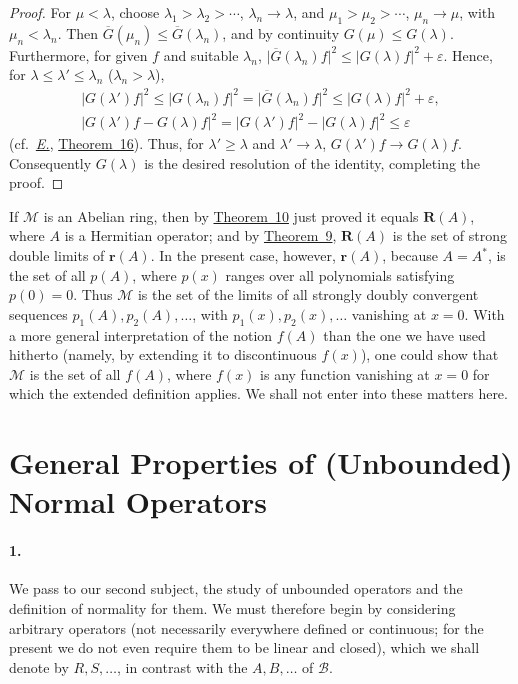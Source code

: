 \documentclass[
  paper=b5,
  twoside=true,
  fontsize=13pt,
  headings=normal,
  bookmarkpackage=false
]{scrartcl}
\theoremstyle{definition}
\newcommand{\TheoremRef}[1]{\hyperref[thm:#1]{Theorem~#1}}
\newcommand{\Eref}{\hyperref[fn:E-paper]{\emph{E.}}}
\newcommand{\ErefText}[1]{\href{https://doi.org/10.1007/BF01782338}{#1}}
\newcommand{\GeneratedRing}{\boldsymbol{R}}
\newcommand{\AlgebraicRing}{\boldsymbol{r}}
\begin{document}
\begin{proof}
For \(\mu<\lambda\), choose \(\lambda_1>\lambda_2>\cdots\),
\(\lambda_n\to\lambda\), and \(\mu_1>\mu_2>\cdots\), \(\mu_n\to\mu\),
with \(\mu_n<\lambda_n\). Then
\(\overline G(\mu_n)\leq\overline G(\lambda_n)\), and by continuity
\(G(\mu)\leq G(\lambda)\). Furthermore, for given \(f\) and suitable
\(\lambda_n\), \(\lvert\overline G(\lambda_n)f\rvert^2
\leq\lvert G(\lambda)f\rvert^2+\varepsilon\). Hence, for
\(\lambda\leq\lambda'\leq\lambda_n\) (\(\lambda_n>\lambda\)),
\begin{gather*}
  \lvert G(\lambda')f\rvert^2
  \leq\lvert G(\lambda_n)f\rvert^2
  =\lvert\overline G(\lambda_n)f\rvert^2
  \leq\lvert G(\lambda)f\rvert^2+\varepsilon,\\
  \lvert G(\lambda')f-G(\lambda)f\rvert^2
  =\lvert G(\lambda')f\rvert^2-\lvert G(\lambda)f\rvert^2
  \leq\varepsilon
\end{gather*}
(cf.\ \Eref, \ErefText{Theorem~16}). Thus, for \(\lambda'\geq\lambda\) and
\(\lambda'\to\lambda\), \(G(\lambda')f\to G(\lambda)f\). Consequently
\(G(\lambda)\) is the desired resolution of the identity, completing
the proof.
\end{proof}

If \(\mathcal M\) is an Abelian ring, then by \TheoremRef{10} just
proved it equals \(\GeneratedRing (A)\), where \(A\) is a Hermitian operator; and by
\TheoremRef{9}, \(\GeneratedRing (A)\) is the set of strong double limits of \(\AlgebraicRing (A)\).
In the present case, however, \(\AlgebraicRing (A)\), because \(A=A^*\), is the set
of all \(p(A)\), where \(p(x)\) ranges over all polynomials satisfying
\(p(0)=0\).  Thus \(\mathcal M\) is the set of the limits of all
strongly doubly convergent sequences \(p_1(A),p_2(A),\ldots\),
with \(p_1(x),p_2(x),\ldots\) vanishing at \(x=0\).
With a more general interpretation of the notion \(f(A)\) than the one
we have used hitherto (namely, by extending it to discontinuous
\(f(x)\)), one could show that \(\mathcal M\) is the set of all \(f(A)\),
where \(f(x)\) is any function vanishing at \(x=0\) for which the
extended definition applies.  We shall not enter into these matters
here.

\section{General Properties of (Unbounded) Normal Operators}
\label{sec:iv-normal-operators}

\paragraph*{1.}\label{sec:iv-1}
We pass to our second subject, the study of unbounded operators and the
definition of normality for them.  We must therefore begin by considering
arbitrary operators (not necessarily everywhere defined or continuous;
for the present we do not even require them to be linear and closed),
which we shall denote by \(R,S,\ldots\), in contrast with the
\(A,B,\ldots\) of \(\mathcal B\).
\end{document}
